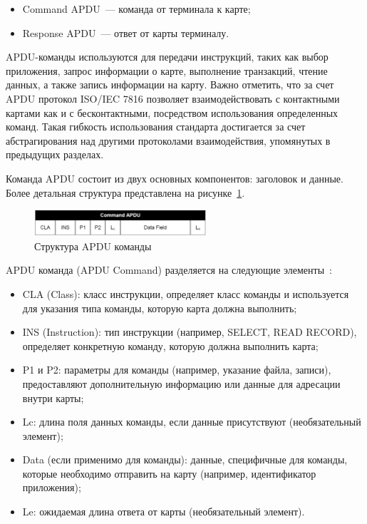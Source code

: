 \begin{itemize}
    \item Command APDU~--- команда от терминала к карте;
    \item Response APDU~--- ответ от карты терминалу.
\end{itemize}


APDU-команды используются для передачи инструкций, таких как выбор приложения, запрос информации о карте, выполнение транзакций, чтение данных, а также запись информации на карту.
Важно отметить, что за счет APDU протокол ISO/IEC 7816 позволяет взаимодействовать с контактными картами как и с бесконтактными, посредством использования определенных команд.
Такая гибкость использования стандарта достигается за счет абстрагирования над другими протоколами взаимодействия, упомянутых в предыдущих разделах.

Команда APDU состоит из двух основных компонентов: заголовок и данные.
Более детальная структура представлена на рисунке~\ref{fig:apdu_com}.

\begin{figure}[H]
    \centering
    \includegraphics[width=0.57\textwidth]{images/research/apdu_com}
    \caption{\centering Структура APDU команды}
    \label{fig:apdu_com}
\end{figure}


APDU команда (APDU Command) разделяется на следующие элементы~\cite{medium_apdu2}:

\begin{itemize}
    \item CLA (Class): класс инструкции, определяет класс команды и используется для указания типа команды, которую карта должна выполнить;
    \item INS (Instruction): тип инструкции (например, SELECT, READ RECORD), определяет конкретную команду, которую должна выполнить карта;
    \item P1 и P2: параметры для команды (например, указание файла, записи), предоставляют дополнительную информацию или данные для адресации внутри карты;
    \item Lc: длина поля данных команды, если данные присутствуют (необязательный элемент);
    \item  Data (если применимо для команды): данные, специфичные для команды, которые необходимо отправить на карту (например, идентификатор приложения);
    \item Le: ожидаемая длина ответа от карты (необязательный элемент).
\end{itemize}


